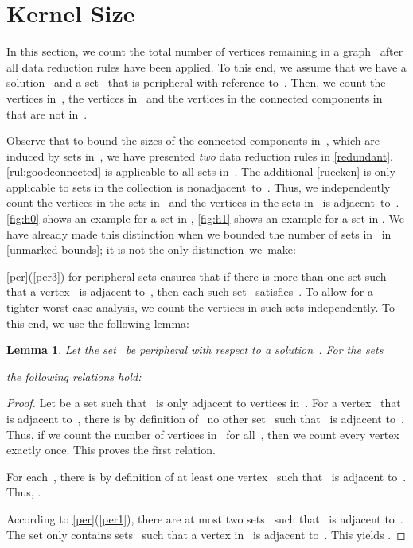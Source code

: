 \documentclass[12pt, a4paper, abstracton]{scrreprt}
\newcounter{theorem}
\newtheorem{lemma}{Lemma}[chapter]
\theoremstyle{definition}
\theoremstyle{remark}
\begin{document}
\section{Kernel Size}
\label{result}
In this section, we count the total number of vertices remaining in a graph~ after all data reduction rules have been applied. To this end, we assume that we have a solution~ and a set~ that is peripheral with reference to~. Then, we count the vertices in~, the vertices in~ and the vertices in the connected components in~ that are not in~.

Observe that to bound the sizes of the connected components in~, which are induced by sets in~, we have presented \emph{two} data reduction rules in \autoref{redundant}. \autoref{rul:goodconnected} is applicable to all sets in~. The additional \autoref{ruecken} is only applicable to sets in the collection  is nonadjacent~to~. Thus, we independently count the vertices in the sets in~ and the vertices in the sets in~ is adjacent~to~. \autoref{fig:h0} shows an example for a set in , \autoref{fig:h1} shows an example for a set in . We have already made this distinction when we bounded the number of sets in~ in \autoref{unmarked-bounds}; it is not the only distinction~we~make:

\autoref{per}(\ref{per3}) for peripheral sets ensures that if there is more than one set  such that a vertex~ is adjacent to~, then each such set~ satisfies~. To allow for a tighter worst-case analysis, we count the vertices in such sets independently. To this end, we use the following lemma:

\begin{lemma}\label{nx-sum}
Let the set~ be peripheral with respect to a solution~.
For the sets
  
the following relations hold:
  
\end{lemma}

\begin{proof}
  Let  be a set such that~ is only adjacent to vertices in~.  For a vertex~ that is adjacent to~, there is by definition of~ no other set~ such that~ is adjacent to~. Thus, if we count the number of vertices in~ for all~, then we count every vertex~ exactly once. This proves the first relation.

  For each~, there is by definition of  at least one vertex~ such that~ is adjacent to~. Thus, .

  According to \autoref{per}(\ref{per1}), there are at most two sets~ such that~ is adjacent to~. The set  only contains sets~ such that a vertex in~ is adjacent to~. This yields .
\end{proof}
\end{document}
